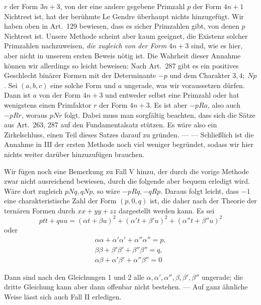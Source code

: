 \(r\) der Form \(3n+3\), von der eine andere gegebene Primzahl
\(p\) der Form \(4n+1\) Nichtrest ist, hat der berühmte Le Gendre
überhaupt nichts hinzugefügt. Wir haben oben in Art.\ 129
bewiesen, dass es sicher Primzahlen gibt, von denen \(p\)
Nichtrest ist. Unsere Methode scheint aber kaum geeignet,
die Existenz solcher Primzahlen nachzuweisen, \textit{die
zugleich von der Form} \(4n+3\) sind, wie es hier, aber nicht
in unserem ersten Beweis nötig ist. Die Wahrheit dieser
Annahme können wir allerdings so leicht beweisen: Nach
Art.\ 287 gibt es ein positives Geschlecht binärer Formen
mit der Determinante \(-p\) und dem Charakter \(3,4;\ Np\). Sei
\((a,b,c)\) eine solche Form und \(a\) ungerade, was wir voraussetzen
dürfen. Dann ist \(a\) von der Form \(4n+3\) und entweder
selbst eine Primzahl oder hat wenigstens einen Primfaktor
\(r\) der Form \(4n+3\). Es ist aber \(-pRa\), also auch
\(-pRr\), woraus \(pNr\) folgt. Dabei muss man sorgfältig
beachten, dass sich die Sätze aus Art.\ 263, 287 auf den
Fundamentalsatz stützen. Es wäre also ein Zirkelschluss,
einen Teil dieses Satzes darauf zu gründen. — — Schließlich
ist die Annahme in III der ersten Methode noch viel weniger
begründet, sodass wir hier nichts weiter darüber hinzuzufügen
brauchen.

Wir fügen noch eine Bemerkung zu Fall V hinzu, der durch
die vorige Methode zwar nicht ausreichend bewiesen, durch
die folgende aber bequem erledigt wird. Wäre dort zugleich
\(pNq,qNp\), so wäre \(-pRq,-qRp\). Daraus folgt leicht, dass \(-1\)
eine charakteristische Zahl der Form \((p,0,q)\) ist, die daher
nach der Theorie der ternären Formen durch \(xx+yy+zz\) dargestellt
werden kann. Es sei
\[ptt+quu=(\alpha t+\beta u)^2+(\alpha't+\beta'u)^2+(\alpha''t+\beta''u)^2\]
oder
\[\begin{gathered}\alpha\alpha+\alpha'\alpha'+\alpha''\alpha''=p,\\\beta\beta+\beta'\beta'+\beta''\beta''=q,\\\alpha\beta+\alpha'\beta'+\alpha''\beta''=0\end{gathered}\]

Dann sind nach den Gleichungen 1 und 2 alle \(\alpha,\alpha',\alpha'',\beta,\beta',\beta''\) ungerade;
die dritte Gleichung kann aber dann offenbar nicht bestehen.
— Auf ganz ähnliche Weise lässt sich auch Fall II erledigen.
